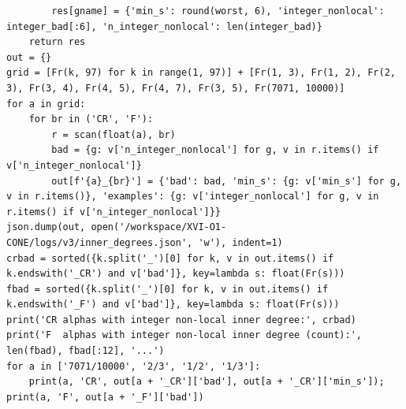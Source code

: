 \documentclass[10pt]{article}
\begin{document}
\begin{lstlisting}
        res[gname] = {'min_s': round(worst, 6), 'integer_nonlocal': integer_bad[:6], 'n_integer_nonlocal': len(integer_bad)}
    return res
out = {}
grid = [Fr(k, 97) for k in range(1, 97)] + [Fr(1, 3), Fr(1, 2), Fr(2, 3), Fr(3, 4), Fr(4, 5), Fr(4, 7), Fr(3, 5), Fr(7071, 10000)]
for a in grid:
    for br in ('CR', 'F'):
        r = scan(float(a), br)
        bad = {g: v['n_integer_nonlocal'] for g, v in r.items() if v['n_integer_nonlocal']}
        out[f'{a}_{br}'] = {'bad': bad, 'min_s': {g: v['min_s'] for g, v in r.items()}, 'examples': {g: v['integer_nonlocal'] for g, v in r.items() if v['n_integer_nonlocal']}}
json.dump(out, open('/workspace/XVI-O1-CONE/logs/v3/inner_degrees.json', 'w'), indent=1)
crbad = sorted({k.split('_')[0] for k, v in out.items() if k.endswith('_CR') and v['bad']}, key=lambda s: float(Fr(s)))
fbad = sorted({k.split('_')[0] for k, v in out.items() if k.endswith('_F') and v['bad']}, key=lambda s: float(Fr(s)))
print('CR alphas with integer non-local inner degree:', crbad)
print('F  alphas with integer non-local inner degree (count):', len(fbad), fbad[:12], '...')
for a in ['7071/10000', '2/3', '1/2', '1/3']:
    print(a, 'CR', out[a + '_CR']['bad'], out[a + '_CR']['min_s']); print(a, 'F', out[a + '_F']['bad'])
\end{lstlisting}
\end{document}
